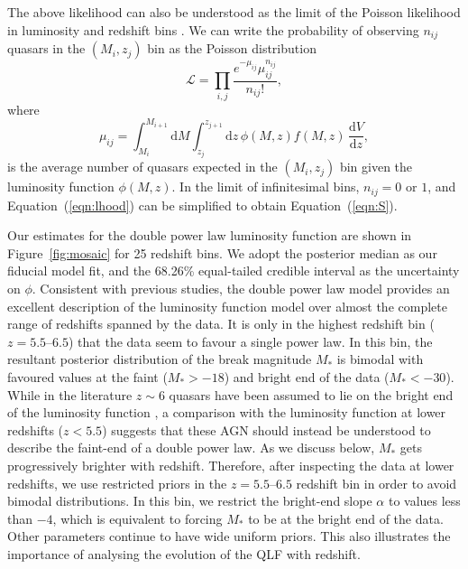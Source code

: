 \documentclass[fleqn,usenatbib]{mnras}
\begin{document}
The above likelihood can also be understood as the limit of the
Poisson likelihood in luminosity and redshift bins
\citep{1983ApJ...269...35M, 2001AJ....121...54F}.  We can write the
probability of observing $n_{ij}$ quasars in the $(M_i, z_j)$ bin as
the Poisson distribution
\begin{equation}
  \mathcal{L}=\prod_{i,j}\frac{e^{-\mu_{ij}}\mu_{ij}^{n_{ij}}}{n_{ij}!},
  \label{eqn:lhood}
\end{equation}
where 
\begin{equation}
  \mu_{ij}= \int_{M_i}^{M_{i+1}}\mathrm{d}M\int_{z_j}^{z_{j+1}}\mathrm{d}z\, \phi(M,z) f(M, z)
  \,\frac{\mathrm{d}V}{\mathrm{d}z},
\end{equation}
is the average number of quasars expected in the $(M_i, z_j)$ bin
given the luminosity function $\phi(M,z)$.  In the limit of
infinitesimal bins, $n_{ij}=0$ or $1$, and Equation~(\ref{eqn:lhood})
can be simplified to obtain Equation~(\ref{eqn:S}).

Our estimates for the double power law luminosity function are shown
in Figure~\ref{fig:mosaic} for 25 redshift bins.  We adopt the
posterior median as our fiducial model fit, and the 68.26\%
equal-tailed credible interval as the uncertainty on $\phi$.
Consistent with previous studies, the double power law model provides
an excellent description of the luminosity function model over almost
the complete range of redshifts spanned by the data.  It is only in
the highest redshift bin ($z=5.5$--$6.5$) that the data seem to favour
a single power law.  In this bin, the resultant posterior distribution
of the break magnitude $M_*$ is bimodal with favoured values at the
faint ($M_*>-18$) and bright end of the data ($M_*<-30$).  While in
the literature $z\sim 6$ quasars have been assumed to lie on the
bright end of the luminosity function
\citep[e.g.,][]{2016ApJ...833..222J}, a comparison with the luminosity
function at lower redshifts ($z<5.5$) suggests that these AGN should
instead be understood to describe the faint-end of a double power law.
As we discuss below, $M_*$ gets progressively brighter with redshift.
Therefore, after inspecting the data at lower redshifts, we use
restricted priors in the $z=5.5$--$6.5$ redshift bin in order to avoid
bimodal distributions.  In this bin, we restrict the bright-end slope
$\alpha$ to values less than $-4$, which is equivalent to forcing
$M_*$ to be at the bright end of the data.  Other parameters continue
to have wide uniform priors.  This also illustrates the importance of
analysing the evolution of the QLF with redshift.
\end{document}
